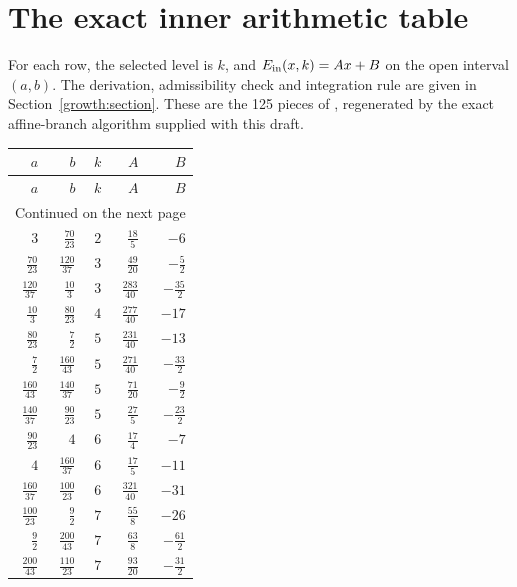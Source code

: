 \section{The exact inner arithmetic table}\label{growth:table-appendix}
For each row, the selected level is \(k\), and
\(E_{\rm in}(x,k)=Ax+B\) on the open interval \((a,b)\).
The derivation, admissibility check and integration rule are given
in Section~\ref{growth:section}. These are the 125 pieces of
\cite[\texttt{Growth/InnerTable.lean}, \texttt{InnerSum.lean}]{firsching},
regenerated by the exact affine-branch algorithm supplied with this draft.
{\small
\setlength{\LTleft}{0pt}\setlength{\LTright}{0pt}
\renewcommand{\arraystretch}{1.15}
\begin{longtable}{@{\extracolsep{\fill}}rrrrr}
\toprule \(a\)&\(b\)&\(k\)&\(A\)&\(B\)\\\midrule\endfirsthead
\toprule \(a\)&\(b\)&\(k\)&\(A\)&\(B\)\\\midrule\endhead
\midrule\multicolumn{5}{r}{Continued on the next page}\\\endfoot
\bottomrule\endlastfoot
$3$ & $\frac{70}{23}$ & $2$ & $\frac{18}{5}$ & $-6$ \\
$\frac{70}{23}$ & $\frac{120}{37}$ & $3$ & $\frac{49}{20}$ & $-\frac{5}{2}$ \\
$\frac{120}{37}$ & $\frac{10}{3}$ & $3$ & $\frac{283}{40}$ & $-\frac{35}{2}$ \\
$\frac{10}{3}$ & $\frac{80}{23}$ & $4$ & $\frac{277}{40}$ & $-17$ \\
$\frac{80}{23}$ & $\frac{7}{2}$ & $5$ & $\frac{231}{40}$ & $-13$ \\
$\frac{7}{2}$ & $\frac{160}{43}$ & $5$ & $\frac{271}{40}$ & $-\frac{33}{2}$ \\
$\frac{160}{43}$ & $\frac{140}{37}$ & $5$ & $\frac{71}{20}$ & $-\frac{9}{2}$ \\
$\frac{140}{37}$ & $\frac{90}{23}$ & $5$ & $\frac{27}{5}$ & $-\frac{23}{2}$ \\
$\frac{90}{23}$ & $4$ & $6$ & $\frac{17}{4}$ & $-7$ \\
$4$ & $\frac{160}{37}$ & $6$ & $\frac{17}{5}$ & $-11$ \\
$\frac{160}{37}$ & $\frac{100}{23}$ & $6$ & $\frac{321}{40}$ & $-31$ \\
$\frac{100}{23}$ & $\frac{9}{2}$ & $7$ & $\frac{55}{8}$ & $-26$ \\
$\frac{9}{2}$ & $\frac{200}{43}$ & $7$ & $\frac{63}{8}$ & $-\frac{61}{2}$ \\
$\frac{200}{43}$ & $\frac{110}{23}$ & $7$ & $\frac{93}{20}$ & $-\frac{31}{2}$ \\

\end{longtable}}
